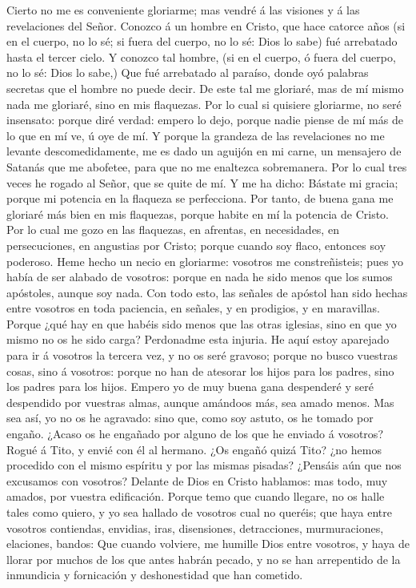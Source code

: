  Cierto no me es conveniente gloriarme; mas vendré á las
visiones y á las revelaciones del Señor.  Conozco á un
hombre en Cristo, que hace catorce años (si en el cuerpo, no lo sé; si
fuera del cuerpo, no lo sé: Dios lo sabe) fué arrebatado hasta el tercer
cielo.  Y conozco tal hombre, (si en el cuerpo, ó fuera del
cuerpo, no lo sé: Dios lo sabe,)  Que fué arrebatado al
paraíso, donde oyó palabras secretas que el hombre no puede decir.
 De este tal me gloriaré, mas de mí mismo nada me gloriaré,
sino en mis flaquezas.  Por lo cual si quisiere gloriarme,
no seré insensato: porque diré verdad: empero lo dejo, porque nadie
piense de mí más de lo que en mí ve, ú oye de mí.  Y porque
la grandeza de las revelaciones no me levante descomedidamente, me es
dado un aguijón en mi carne, un mensajero de Satanás que me abofetee,
para que no me enaltezca sobremanera.  Por lo cual tres
veces he rogado al Señor, que se quite de mí.  Y me ha
dicho: Bástate mi gracia; porque mi potencia en la flaqueza se
perfecciona. Por tanto, de buena gana me gloriaré más bien en mis
flaquezas, porque habite en mí la potencia de Cristo.  Por
lo cual me gozo en las flaquezas, en afrentas, en necesidades, en
persecuciones, en angustias por Cristo; porque cuando soy flaco,
entonces soy poderoso.  Heme hecho un necio en gloriarme:
vosotros me constreñisteis; pues yo había de ser alabado de vosotros:
porque en nada he sido menos que los sumos apóstoles, aunque soy nada.
 Con todo esto, las señales de apóstol han sido hechas
entre vosotros en toda paciencia, en señales, y en prodigios, y en
maravillas.  Porque ¿qué hay en que habéis sido menos que
las otras iglesias, sino en que yo mismo no os he sido carga? Perdonadme
esta injuria.  He aquí estoy aparejado para ir á vosotros
la tercera vez, y no os seré gravoso; porque no busco vuestras cosas,
sino á vosotros: porque no han de atesorar los hijos para los padres,
sino los padres para los hijos.  Empero yo de muy buena
gana despenderé y seré despendido por vuestras almas, aunque amándoos
más, sea amado menos.  Mas sea así, yo no os he agravado:
sino que, como soy astuto, os he tomado por engaño.  ¿Acaso
os he engañado por alguno de los que he enviado á vosotros?
 Rogué á Tito, y envié con él al hermano. ¿Os engañó quizá
Tito? ¿no hemos procedido con el mismo espíritu y por las mismas
pisadas?  ¿Pensáis aún que nos excusamos con vosotros?
Delante de Dios en Cristo hablamos: mas todo, muy amados, por vuestra
edificación.  Porque temo que cuando llegare, no os halle
tales como quiero, y yo sea hallado de vosotros cual no queréis; que
haya entre vosotros contiendas, envidias, iras, disensiones,
detracciones, murmuraciones, elaciones, bandos:  Que cuando
volviere, me humille Dios entre vosotros, y haya de llorar por muchos de
los que antes habrán pecado, y no se han arrepentido de la inmundicia y
fornicación y deshonestidad que han cometido.

